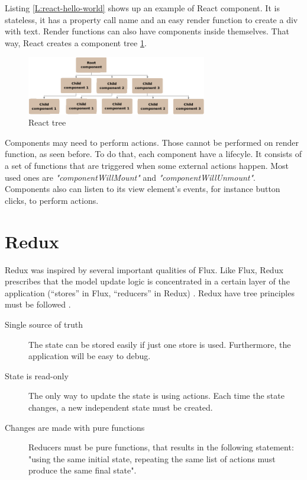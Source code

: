 \begin{codefigure}
\end{codefigure}

Listing \ref{L:react-hello-world} shows up an example of React component. It is stateless, it has a property call name and an easy render function to create a
div with text. Render functions can also have components inside themselves. That
way, React creates a component tree \ref{F:react-tree}.

\begin{figure}[htb]
	\begin{center}
		\includegraphics[width=0.7\textwidth]{./figures/react-tree.png}
		\caption{React tree}
		\label{F:react-tree}
	\end{center}
\end{figure}

Components may need to perform actions. Those cannot be performed on render 
function, as seen before. To do that, each component have a lifecyle. It 
consists of a set of functions that are triggered when some external actions 
happen. Most used ones are \textit{"componentWillMount"} and 
\textit{"componentWillUnmount"}. Components also can listen to its view
element's events, for instance button clicks, to perform actions.

\section{Redux}

Redux was inspired by several important qualities of Flux. Like Flux, Redux
prescribes that the model update logic is concentrated in a certain layer of
the application (“stores” in Flux, “reducers” in Redux) \cite{redux-prior-art}.
Redux have tree principles must be followed \cite{redux-principles}.

\begin{description}
	\item [Single source of truth]
	The state can be stored easily if just one store is used. Furthermore, the
	application will be easy to debug.
	
	\item [State is read-only]
	The only way to update the state is using actions. Each time the state
	changes, a new independent state must be created.

	\item [Changes are made with pure functions]
	Reducers must be pure functions, that results in the following statement:
	"using the same initial state, repeating the same list of actions must
	produce the same final state".

\end{description}


